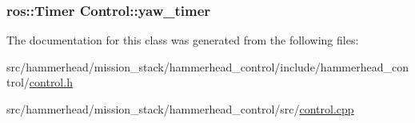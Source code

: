 \subsubsection[{\texorpdfstring{yaw\+\_\+timer}{yaw_timer}}]{\setlength{\rightskip}{0pt plus 5cm}ros\+::\+Timer Control\+::yaw\+\_\+timer\hspace{0.3cm}{\ttfamily [private]}}\hypertarget{classControl_a774bb8a7f0b6355dd487eac011fc54e2}{}\label{classControl_a774bb8a7f0b6355dd487eac011fc54e2}


The documentation for this class was generated from the following files\+:\begin{DoxyCompactItemize}
\item 
src/hammerhead/mission\+\_\+stack/hammerhead\+\_\+control/include/hammerhead\+\_\+control/\hyperlink{control_8h}{control.\+h}\item 
src/hammerhead/mission\+\_\+stack/hammerhead\+\_\+control/src/\hyperlink{control_8cpp}{control.\+cpp}\end{DoxyCompactItemize}
